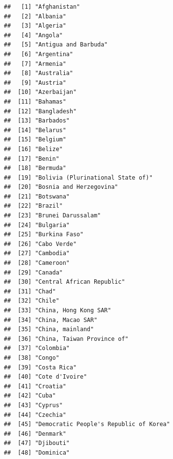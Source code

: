 \documentclass[]{article}
\begin{document}
\begin{verbatim}
##   [1] "Afghanistan"                              
##   [2] "Albania"                                  
##   [3] "Algeria"                                  
##   [4] "Angola"                                   
##   [5] "Antigua and Barbuda"                      
##   [6] "Argentina"                                
##   [7] "Armenia"                                  
##   [8] "Australia"                                
##   [9] "Austria"                                  
##  [10] "Azerbaijan"                               
##  [11] "Bahamas"                                  
##  [12] "Bangladesh"                               
##  [13] "Barbados"                                 
##  [14] "Belarus"                                  
##  [15] "Belgium"                                  
##  [16] "Belize"                                   
##  [17] "Benin"                                    
##  [18] "Bermuda"                                  
##  [19] "Bolivia (Plurinational State of)"         
##  [20] "Bosnia and Herzegovina"                   
##  [21] "Botswana"                                 
##  [22] "Brazil"                                   
##  [23] "Brunei Darussalam"                        
##  [24] "Bulgaria"                                 
##  [25] "Burkina Faso"                             
##  [26] "Cabo Verde"                               
##  [27] "Cambodia"                                 
##  [28] "Cameroon"                                 
##  [29] "Canada"                                   
##  [30] "Central African Republic"                 
##  [31] "Chad"                                     
##  [32] "Chile"                                    
##  [33] "China, Hong Kong SAR"                     
##  [34] "China, Macao SAR"                         
##  [35] "China, mainland"                          
##  [36] "China, Taiwan Province of"                
##  [37] "Colombia"                                 
##  [38] "Congo"                                    
##  [39] "Costa Rica"                               
##  [40] "Cote d'Ivoire"                            
##  [41] "Croatia"                                  
##  [42] "Cuba"                                     
##  [43] "Cyprus"                                   
##  [44] "Czechia"                                  
##  [45] "Democratic People's Republic of Korea"    
##  [46] "Denmark"                                  
##  [47] "Djibouti"                                 
##  [48] "Dominica"                                 

\end{verbatim}
\end{document}
